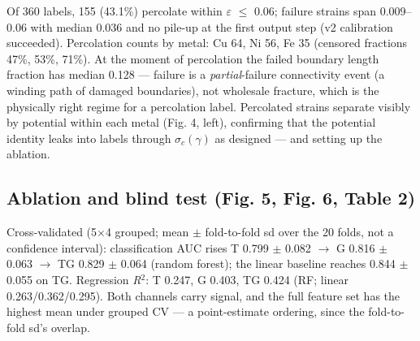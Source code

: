 \documentclass[11pt]{article}
\begin{document}
Of 360 labels, 155 (43.1\%) percolate within $\varepsilon$ $\le$ 0.06; failure strains span 0.009--0.06 with median 0.036 and no pile-up at the first output step (v2 calibration succeeded). Percolation counts by metal: Cu 64, Ni 56, Fe 35 (censored fractions 47\%, 53\%, 71\%). At the moment of percolation the failed boundary length fraction has median 0.128 --- failure is a \textit{partial}-failure connectivity event (a winding path of damaged boundaries), not wholesale fracture, which is the physically right regime for a percolation label. Percolated strains separate visibly by potential within each metal (Fig. 4, left), confirming that the potential identity leaks into labels through $\sigma_{c}(\gamma)$ as designed --- and setting up the ablation.

\subsection{Ablation and blind test (Fig. 5, Fig. 6, Table 2)}

Cross-validated (5$\times$4 grouped; mean $\pm$ fold-to-fold sd over the 20 folds, not a confidence interval): classification AUC rises T 0.799 $\pm$ 0.082 $\rightarrow$ G 0.816 $\pm$ 0.063 $\rightarrow$ TG 0.829 $\pm$ 0.064 (random forest); the linear baseline reaches 0.844 $\pm$ 0.055 on TG. Regression \textit{R}$^{2}$: T 0.247, G 0.403, TG 0.424 (RF; linear 0.263/0.362/0.295). Both channels carry signal, and the full feature set has the highest mean under grouped CV --- a point-estimate ordering, since the fold-to-fold sd's overlap.
\end{document}
